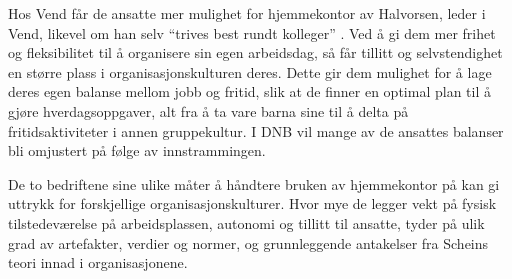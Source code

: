 Hos Vend får de ansatte mer mulighet for hjemmekontor av Halvorsen, leder i Vend, likevel om han selv \enquote{trives best rundt kolleger} \parencite{ingebrigtsen_vend_2026}. Ved å gi dem mer frihet og fleksibilitet til å organisere sin egen arbeidsdag, så får tillitt og selvstendighet en større plass i organisasjonskulturen deres. Dette gir dem mulighet for å lage deres egen balanse mellom jobb og fritid, slik at de finner en optimal plan til å gjøre hverdagsoppgaver, alt fra å ta vare barna sine til å delta på fritidsaktiviteter i annen gruppekultur. I DNB vil mange av de ansattes balanser bli omjustert på følge av innstrammingen.

De to bedriftene sine ulike måter å håndtere bruken av hjemmekontor på kan gi uttrykk for forskjellige organisasjonskulturer. Hvor mye de legger vekt på fysisk tilstedeværelse på arbeidsplassen, autonomi og tillitt til ansatte, tyder på ulik grad av artefakter, verdier og normer, og grunnleggende antakelser fra Scheins teori innad i organisasjonene.
